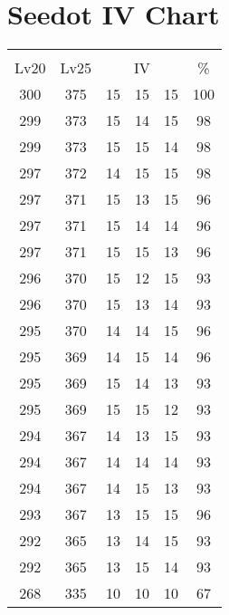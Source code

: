 \documentclass{article}%
\begin{document}
%
\normalsize%
\section{Seedot IV Chart}%
\label{sec:Seedot IV Chart}%
\renewcommand{\arraystretch}{1.5}%
\begin{tabular}{|c|c|c|c|c|c|}%
\hline%
\multicolumn{6}{|c|}{\textcolor{white}{ 
\linebreak{Seedot}
}%
\cellcolor{black}}\\%
\multicolumn{1}{|c}{Lv20}&\multicolumn{1}{c|}{Lv25}&\multicolumn{3}{c|}{IV}&\multicolumn{1}{|c|}{\%}\\%
\hline%
\rowcolor{color100}%
300&375&15&15&15&100\\%
\hline%
\rowcolor{color98}%
299&373&15&14&15&98\\%
\hline%
\rowcolor{color98}%
299&373&15&15&14&98\\%
\hline%
\rowcolor{color98}%
297&372&14&15&15&98\\%
\hline%
\rowcolor{color96}%
297&371&15&13&15&96\\%
\hline%
\rowcolor{color96}%
297&371&15&14&14&96\\%
\hline%
\rowcolor{color96}%
297&371&15&15&13&96\\%
\hline%
\rowcolor{color93}%
296&370&15&12&15&93\\%
\hline%
\rowcolor{color93}%
296&370&15&13&14&93\\%
\hline%
\rowcolor{color96}%
295&370&14&14&15&96\\%
\hline%
\rowcolor{color96}%
295&369&14&15&14&96\\%
\hline%
\rowcolor{color93}%
295&369&15&14&13&93\\%
\hline%
\rowcolor{color93}%
295&369&15&15&12&93\\%
\hline%
\rowcolor{color93}%
294&367&14&13&15&93\\%
\hline%
\rowcolor{color93}%
294&367&14&14&14&93\\%
\hline%
\rowcolor{color93}%
294&367&14&15&13&93\\%
\hline%
\rowcolor{color96}%
293&367&13&15&15&96\\%
\hline%
\rowcolor{color93}%
292&365&13&14&15&93\\%
\hline%
\rowcolor{color93}%
292&365&13&15&14&93\\%
\hline%
\rowcolor{color91}%
268&335&10&10&10&67\\%
\end{tabular}

%
\end{document}
